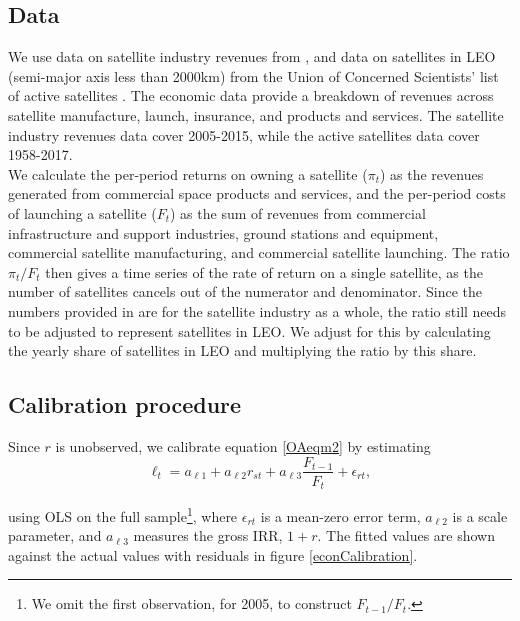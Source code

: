 \documentclass[12pt]{article}
\begin{document}
\subsection*{Data}

We use data on satellite industry revenues from \citet{wienzierl2018}, and data on satellites in LEO (semi-major axis less than 2000km) from the Union of Concerned Scientists' list of active satellites \citep{UCSdata}. The economic data provide a breakdown of revenues across satellite manufacture, launch, insurance, and products and services. The satellite industry revenues data cover 2005-2015, while the active satellites data cover 1958-2017. \\

We calculate the per-period returns on owning a satellite ($\pi_t$) as the revenues generated from commercial space products and services, and the per-period costs of launching a satellite ($F_t$) as the sum of revenues from commercial infrastructure and support industries, ground stations and equipment, commercial satellite manufacturing, and commercial satellite launching. The ratio $\pi_t/F_t$ then gives a time series of the rate of return on a single satellite, as the number of satellites cancels out of the numerator and denominator. Since the numbers provided in \citet{wienzierl2018} are for the satellite industry as a whole, the ratio still needs to be adjusted to represent satellites in LEO. We adjust for this by calculating the yearly share of satellites in LEO and multiplying the ratio by this share. \\

\subsection*{Calibration procedure}

Since $r$ is unobserved, we calibrate equation \ref{OAeqm2} by estimating
\begin{equation}
\label{empiricalEqn}
\ell_{t} = a_{\ell 1} + a_{\ell 2} r_{st} + a_{\ell 3} \frac{F_{t-1}}{F_t} + \epsilon_{r t},
\end{equation}

using OLS on the full sample\footnote{We omit the first observation, for 2005, to construct $F_{t-1}/F_{t}$.}, where $\epsilon_{rt}$ is a mean-zero error term, $a_{\ell 2}$ is a scale parameter, and $a_{\ell 3}$ measures the gross IRR, $1+r$. The fitted values are shown against the actual values with residuals in figure \ref{econCalibration}.
\end{document}
